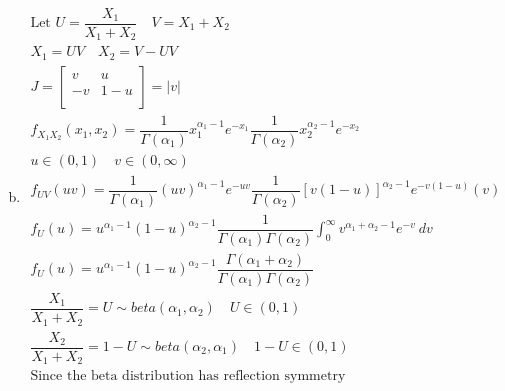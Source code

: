 \documentclass{article}
\begin{document}
\begin{flushleft}
\begin{enumerate}[(a)]
\begin{multline*}
\end{multline*}
\item 
\begin{multline*}
\text{Let } U=\dfrac{X_1}{X_1+X_2} \quad V=X_1+X_2\\
X_1=UV \quad X_2=V-UV\\
J=\begin{bmatrix}
v & u\\
-v & 1-u\\
\end{bmatrix} =|v|\\
f_{X_1X_2}(x_1,x_2)=\dfrac{1}{\Gamma(\alpha_1)}x_1^{\alpha_1-1}e^{-x_1}\dfrac{1}{\Gamma(\alpha_2)}x_2^{\alpha_2-1}e^{-x_2}\\
u \in (0,1) \quad v \in (0,\infty)\\
f_{UV}(uv)=\dfrac{1}{\Gamma(\alpha_1)}{(uv)}^{\alpha_1-1}e^{-uv}\dfrac{1}{\Gamma(\alpha_2)}{[v(1-u)]}^{\alpha_2-1}e^{-v(1-u)}(v)\\
f_U(u)=u^{\alpha_1-1}(1-u)^{\alpha_2-1}\dfrac{1}{\Gamma(\alpha_1)\Gamma(\alpha_2)}\int_{0}^{\infty}v^{\alpha_1+\alpha_2-1}e^{-v} \ dv\\
f_U(u)=u^{\alpha_1-1}(1-u)^{\alpha_2-1}\dfrac{\Gamma(\alpha_1+\alpha_2)}{\Gamma(\alpha_1)\Gamma(\alpha_2)}\\
\dfrac{X_1}{X_1+X_2}=U\sim beta(\alpha_1,\alpha_2) \quad U \in (0,1)\\
\dfrac{X_2}{X_1+X_2}=1-U\sim beta(\alpha_2,\alpha_1) \quad 1-U \in (0,1)\\
\text{Since the beta distribution has reflection symmetry}\\
\end{multline*}
\end{enumerate}

\end{flushleft}
\end{document}
